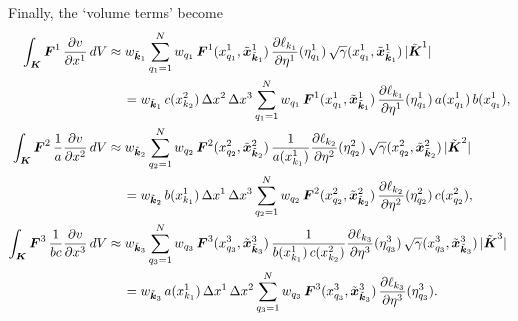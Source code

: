 \documentclass[10pt,preprint]{aastex}
\newcommand{\dx}{\Delta x}
\begin{document}
Finally, the `volume terms' become
\begin{align}
  \int_{\bK}\bF^{1}\,\pderiv{v}{x^{1}}\,dV
  &\approx w_{\tilde{\bk}_{1}}\sum_{q_{1}=1}^{N}w_{q_{1}}\,\bF^{1}(x_{q_{1}}^{1},\tilde{\bx}_{\tilde{\bk}_{1}}^{1})\,
  \pderiv{\ell_{k_{1}}}{\eta^{1}}(\eta_{q_{1}}^{1})\,\sqrt{\gamma}(x_{q_{1}}^{1},\tilde{\bx}_{\tilde{\bk}_{1}}^{1})\,|\tilde{\bK}^{1}| \nonumber \\
  &\hspace{12pt}
  =w_{\tilde{\bk}_{1}}\,c(x_{k_{2}}^{2})\,\dx^{2}\,\dx^{3}
  \sum_{q_{1}=1}^{N}w_{q_{1}}\,\bF^{1}(x_{q_{1}}^{1},\tilde{\bx}_{\tilde{\bk}_{1}}^{1})\,
  \pderiv{\ell_{k_{1}}}{\eta^{1}}(\eta_{q_{1}}^{1})\,a(x_{q_{1}}^{1})\,b(x_{q_{1}}^{1}), \\
  \int_{\bK}\bF^{2}\,\f{1}{a}\pderiv{v}{x^{2}}\,dV
  &\approx w_{\tilde{\bk}_{2}}\sum_{q_{2}=1}^{N}w_{q_{2}}\,\bF^{2}(x_{q_{2}}^{2},\tilde{\bx}_{\tilde{\bk}_{2}}^{2})\,
  \f{1}{a(x_{k_{1}}^{1})}\pderiv{\ell_{k_{2}}}{\eta^{2}}(\eta_{q_{2}}^{2})\,\sqrt{\gamma}(x_{q_{2}}^{2},\tilde{\bx}_{\tilde{\bk}_{2}}^{2})\,|\tilde{\bK}^{2}| \\
  &\hspace{12pt}
  =w_{\tilde{\bk}_{2}}\,b(x_{k_{1}}^{1})\,\dx^{1}\,\dx^{3}\sum_{q_{2}=1}^{N}w_{q_{2}}\,\bF^{2}(x_{q_{2}}^{2},\tilde{\bx}_{\tilde{\bk}_{2}}^{2})\,
  \pderiv{\ell_{k_{2}}}{\eta^{2}}(\eta_{q_{2}}^{2})\,c(x_{q_{2}}^{2}), \\
  \int_{\bK}\bF^{3}\,\f{1}{bc}\pderiv{v}{x^{3}}\,dV
  &\approx w_{\tilde{\bk}_{3}}\sum_{q_{3}=1}^{N}w_{q_{3}}\,\bF^{3}(x_{q_{3}}^{3},\tilde{\bx}_{\tilde{\bk}_{3}}^{3})\,
  \f{1}{b(x_{k_{1}}^{1})\,c(x_{k_{2}}^{2})}\pderiv{\ell_{k_{3}}}{\eta^{3}}(\eta_{q_{3}}^{3})\,\sqrt{\gamma}(x_{q_{3}}^{3},\tilde{\bx}_{\tilde{\bk}_{3}}^{3})\,|\tilde{\bK}^{3}| \nonumber \\
  &\hspace{12pt}
  =w_{\tilde{\bk}_{3}}\,a(x_{k_{1}}^{1})\,\dx^{1}\,\dx^{2}\sum_{q_{3}=1}^{N}w_{q_{3}}\,\bF^{3}(x_{q_{3}}^{3},\tilde{\bx}_{\tilde{\bk}_{3}}^{3})\,
  \pderiv{\ell_{k_{3}}}{\eta^{3}}(\eta_{q_{3}}^{3}).  
\end{align}
\end{document}
